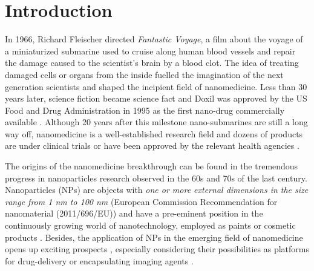 \chapter{Introduction}
\label{chap:introduction}


In 1966, Richard Fleischer directed \emph{Fantastic Voyage}, a film about the voyage of a miniaturized submarine used to cruise along human blood vessels and repair the damage caused to the scientist's brain by a blood clot. The idea of treating damaged cells or organs from the inside fuelled the imagination of the next generation scientists and shaped the incipient field of nanomedicine. Less than 30 years later, science fiction became science fact and Doxil was approved by the US Food and Drug Administration in 1995 as the first nano-drug commercially available \citep{barenholz_doxil-first_2012}. Although 20 years after this milestone nano-submarines are still a long way off, nanomedicine is a well-established research field and dozens of products are under clinical trials or have been approved by the relevant health agencies \citep{etheridge_big_2013}.

The origins of the nanomedicine breakthrough can be found in the tremendous progress in nanoparticles research observed in the 60s and 70s of the last century. Nanoparticles (NPs) are objects with \emph{one or more external dimensions in the size range from 1 nm to 100 nm} (European Commission Recommendation for nanomaterial (2011/696/EU)) and have a pre-eminent position in the continuously growing world of nanotechnology, employed as paints or cosmetic products \citep{guterres_polymeric_2007}. Besides, the application of NPs in the emerging field of nanomedicine opens up exciting prospects \citep{sahoo_nanotech_2003, wickline_nanotechnology_2003, rosen_rise_2005, nie_nanotechnology_2007,zhou_nano-enabled_2014}, especially considering their possibilities as platforms for drug-delivery \citep{wang_nanoparticle_2012} or encapsulating imaging agents \citep{tao_shape-specific_2011}.

